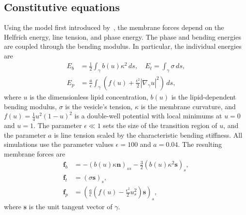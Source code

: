 \documentclass[twoside,twocolumn,9pt]{article}
\newcommand{\ff}{\mathbf{f}}
\newcommand{\nn}{\mathbf{n}}
\renewcommand{\ss}{\mathbf{s}}
\begin{document}
\subsection{Constitutive equations}
Using the model first introduced by~\citet{liu-mar-li-vee-low2017}, the
membrane forces depend on the Helfrich energy, line tension, and phase
energy. The phase and bending energies are coupled through the bending
modulus. In particular, the individual energies are
\begin{align}
  E_b &= \frac{1}{2}\int_{\gamma} b(u) \kappa^2 \, ds, \quad
  E_t = \int_{\gamma} \sigma \, ds, \\
  E_p &= \frac{a}{\epsilon}\int_{\gamma}\left(
  f(u) +\frac{\epsilon^2}{2}|\nabla_\gamma u|^2\right) \, ds,
  \label{eqn:PhaseEnergy}
\end{align}
where $u$ is the dimensionless lipid concentration, $b(u)$ is the
lipid-dependent bending modulus, $\sigma$ is the vesicle's tension,
$\kappa$ is the membrane curvature, and $f(u) = \frac{1}{4}u^2(1-u)^2$
is a double-well potential with local minimums at $u=0$ and $u=1$. The
parameter $\epsilon \ll 1$ sets the size of the transition region of
$u$, and the parameter $a$ is line tension scaled by the characteristic
bending stiffness. All simulations use the parameter values
$\epsilon=100$ and $a=0.04$. The resulting membrane forces are
\begin{align}
  \ff_b &= -(b(u)\kappa \nn)_{ss} -\frac{3}{2}
    \left(b(u) \kappa^2 \ss\right)_s, \\
  \ff_t &= (\sigma \ss)_s, \\
  \ff_p &= \left(\frac{a}{\epsilon}\left(f(u) -
     \frac{\epsilon^2}{2} u_s^2\right) \ss \right)_s,
\end{align}
where $\ss$ is the unit tangent vector of $\gamma$.
\end{document}
